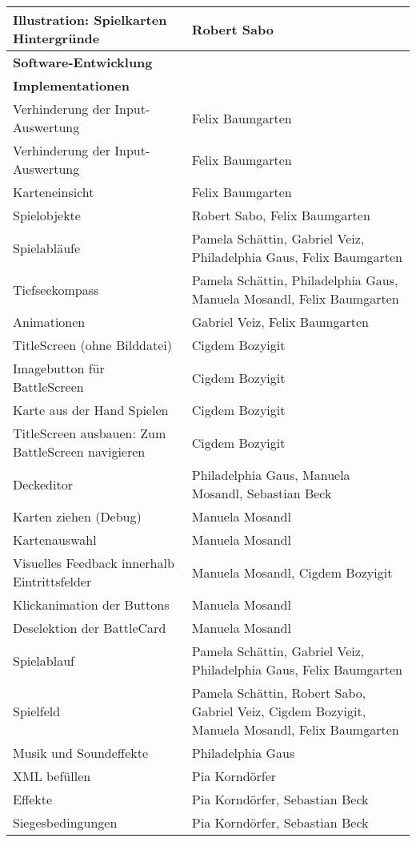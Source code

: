 \begin{longtable}{|p{8cm}|p{10cm}|}
Illustration: Spielkarten Hintergründe & Robert Sabo \\ \hline
\textbf{Software-Entwicklung} & \\ \hline
\textbf{Implementationen} & \\ \hline
Verhinderung der Input-Auswertung & Felix Baumgarten \\ \hline
Verhinderung der Input-Auswertung & Felix Baumgarten \\ \hline
Karteneinsicht & Felix Baumgarten \\ \hline
Spielobjekte & Robert Sabo, Felix Baumgarten \\ \hline
Spielabläufe & Pamela Schättin, Gabriel Veiz, Philadelphia Gaus, Felix Baumgarten \\ \hline
Tiefseekompass & Pamela Schättin, Philadelphia Gaus, Manuela Mosandl, Felix Baumgarten \\ \hline
Animationen & Gabriel Veiz, Felix Baumgarten \\ \hline
TitleScreen (ohne Bilddatei) & Cigdem Bozyigit \\ \hline
Imagebutton für BattleScreen & Cigdem Bozyigit \\ \hline
Karte aus der Hand Spielen & Cigdem Bozyigit \\ \hline
TitleScreen ausbauen: Zum BattleScreen navigieren & Cigdem Bozyigit \\ \hline
Deckeditor & Philadelphia Gaus, Manuela Mosandl, Sebastian Beck \\ \hline
Karten ziehen (Debug) & Manuela Mosandl \\ \hline
Kartenauswahl & Manuela Mosandl \\ \hline
Visuelles Feedback innerhalb Eintrittsfelder & Manuela Mosandl, Cigdem Bozyigit \\ \hline
Klickanimation der Buttons & Manuela Mosandl \\ \hline
Deselektion der BattleCard & Manuela Mosandl \\ \hline
Spielablauf & Pamela Schättin, Gabriel Veiz, Philadelphia Gaus, Felix Baumgarten \\ \hline
Spielfeld & Pamela Schättin, Robert Sabo, Gabriel Veiz, Cigdem Bozyigit, Manuela Mosandl, Felix Baumgarten \\ \hline
Musik und Soundeffekte & Philadelphia Gaus \\ \hline
XML befüllen & Pia Korndörfer \\ \hline
Effekte & Pia Korndörfer, Sebastian Beck \\ \hline
Siegesbedingungen & Pia Korndörfer, Sebastian Beck \\ \hline

\end{longtable}
